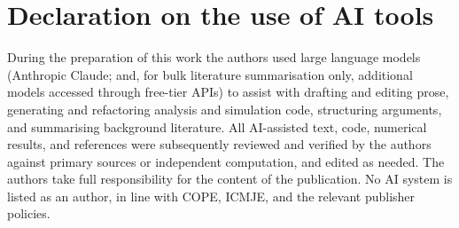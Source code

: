 \documentclass[aip,amsmath,amssymb,reprint]{revtex4-1}
\begin{document}
\section*{Declaration on the use of AI tools}
During the preparation of this work the authors used large language models
(Anthropic Claude; and, for bulk literature summarisation only, additional
models accessed through free-tier APIs) to assist with drafting and editing
prose, generating and refactoring analysis and simulation code, structuring
arguments, and summarising background literature. All AI-assisted text, code,
numerical results, and references were subsequently reviewed and verified by the
authors against primary sources or independent computation, and edited as
needed. The authors take full responsibility for the content of the publication.
No AI system is listed as an author, in line with COPE, ICMJE, and the relevant
publisher policies.



\end{document}
